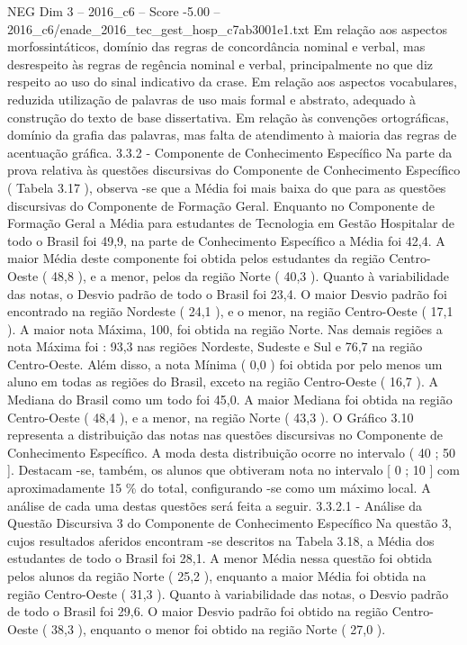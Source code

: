 \begin{textsample}{NEG Dim 3 – 2016\_c6 – Score -5.00 – 2016\_c6/enade\_2016\_tec\_gest\_hosp\_c7ab3001e1.txt}
Em relação aos aspectos morfossintáticos, domínio das regras de concordância nominal e verbal, mas desrespeito às regras de regência nominal e verbal, principalmente no que diz respeito ao uso do sinal indicativo da crase.
Em relação aos aspectos vocabulares, reduzida utilização de palavras de uso mais formal e abstrato, adequado à construção do texto de base dissertativa.
Em relação às convenções ortográficas, domínio da grafia das palavras, mas falta de atendimento à maioria das regras de acentuação gráfica. 3.3.2 - Componente de Conhecimento Específico Na parte da prova relativa às questões discursivas do Componente de Conhecimento Específico ( Tabela 3.17 ), observa -se que a Média foi mais baixa do que para as questões discursivas do Componente de Formação Geral.
Enquanto no Componente de Formação Geral a Média para estudantes de Tecnologia em Gestão Hospitalar de todo o Brasil foi 49,9, na parte de Conhecimento Específico a Média foi 42,4.
A maior Média deste componente foi obtida pelos estudantes da região Centro-Oeste ( 48,8 ), e a menor, pelos da região Norte ( 40,3 ).
Quanto à variabilidade das notas, o Desvio padrão de todo o Brasil foi 23,4.
O maior Desvio padrão foi encontrado na região Nordeste ( 24,1 ), e o menor, na região Centro-Oeste ( 17,1 ).
A maior nota Máxima, 100, foi obtida na região Norte.
Nas demais regiões a nota Máxima foi : 93,3 nas regiões Nordeste, Sudeste e Sul e 76,7 na região Centro-Oeste.
Além disso, a nota Mínima ( 0,0 ) foi obtida por pelo menos um aluno em todas as regiões do Brasil, exceto na região Centro-Oeste ( 16,7 ).
A Mediana do Brasil como um todo foi 45,0.
A maior Mediana foi obtida na região Centro-Oeste ( 48,4 ), e a menor, na região Norte ( 43,3 ).
O Gráfico 3.10 representa a distribuição das notas nas questões discursivas no Componente de Conhecimento Específico.
A moda desta distribuição ocorre no intervalo ( 40 ; 50 ].
Destacam -se, também, os alunos que obtiveram nota no intervalo [ 0 ; 10 ] com aproximadamente 15 \% do total, configurando -se como um máximo local.
A análise de cada uma destas questões será feita a seguir. 3.3.2.1 - Análise da Questão Discursiva 3 do Componente de Conhecimento Específico Na questão 3, cujos resultados aferidos encontram -se descritos na Tabela 3.18, a Média dos estudantes de todo o Brasil foi 28,1.
A menor Média nessa questão foi obtida pelos alunos da região Norte ( 25,2 ), enquanto a maior Média foi obtida na região Centro-Oeste ( 31,3 ).
Quanto à variabilidade das notas, o Desvio padrão de todo o Brasil foi 29,6.
O maior Desvio padrão foi obtido na região Centro-Oeste ( 38,3 ), enquanto o menor foi obtido na região Norte ( 27,0 ).

\end{textsample}
